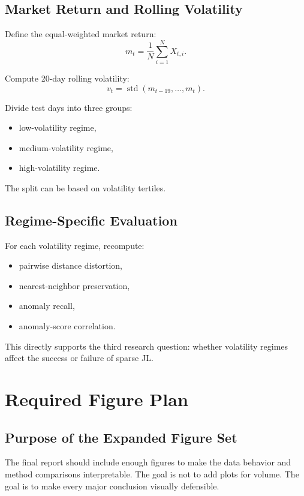 \documentclass[11pt]{article}
\begin{document}
\subsection{Market Return and Rolling Volatility}

Define the equal-weighted market return:
\[
m_t = \frac{1}{N} \sum_{i=1}^{N} X_{t,i}.
\]

Compute 20-day rolling volatility:
\[
v_t = \operatorname{std}(m_{t-19}, \ldots, m_t).
\]

Divide test days into three groups:

\begin{itemize}
    \item low-volatility regime,
    \item medium-volatility regime,
    \item high-volatility regime.
\end{itemize}

The split can be based on volatility tertiles.

\subsection{Regime-Specific Evaluation}

For each volatility regime, recompute:

\begin{itemize}
    \item pairwise distance distortion,
    \item nearest-neighbor preservation,
    \item anomaly recall,
    \item anomaly-score correlation.
\end{itemize}

This directly supports the third research question: whether volatility regimes affect the success or failure of sparse JL.

\section{Required Figure Plan}

\subsection{Purpose of the Expanded Figure Set}

The final report should include enough figures to make the data behavior and method comparisons interpretable. The goal is not to add plots for volume. The goal is to make every major conclusion visually defensible.
\end{document}
